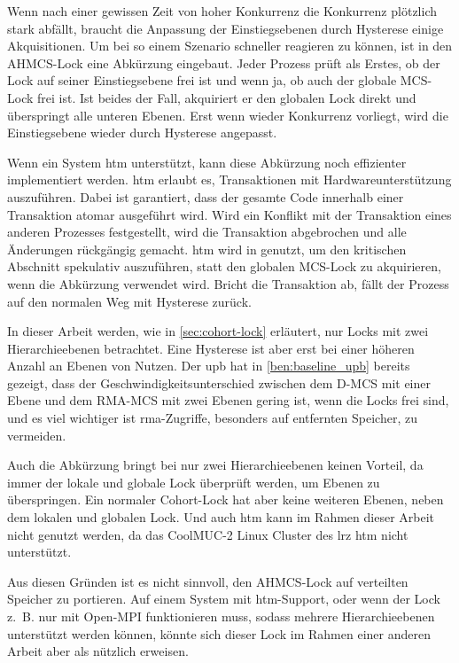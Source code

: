 Wenn nach einer gewissen Zeit von hoher \gls{Konkurrenz}
die \gls{Konkurrenz} plötzlich stark abfällt,
braucht die Anpassung der Einstiegsebenen durch Hysterese einige Akquisitionen.
Um bei so einem Szenario schneller reagieren zu können,
ist in den AHMCS-Lock eine Abkürzung eingebaut.
Jeder Prozess prüft als Erstes,
ob der Lock auf seiner Einstiegsebene frei ist
und wenn ja,
ob auch der globale MCS-Lock frei ist.
Ist beides der Fall,
akquiriert er den globalen Lock direkt
und überspringt alle unteren Ebenen.
Erst wenn wieder \gls{Konkurrenz} vorliegt,
wird die Einstiegsebene wieder durch Hysterese angepasst.

Wenn ein System \gls{htm} unterstützt,
kann diese Abkürzung noch effizienter implementiert werden.
\Gls{htm} erlaubt es,
Transaktionen mit Hardwareunterstützung auszuführen.
Dabei ist garantiert,
dass der gesamte Code innerhalb einer Transaktion atomar ausgeführt wird.
Wird ein Konflikt mit der Transaktion eines anderen Prozesses festgestellt,
wird die Transaktion abgebrochen und alle Änderungen rückgängig gemacht.
\gls{htm} wird in \cite{AHMCS-Lock} genutzt,
um den kritischen Abschnitt spekulativ auszuführen,
statt den globalen MCS-Lock zu akquirieren,
wenn die Abkürzung verwendet wird.
Bricht die Transaktion ab,
fällt der Prozess auf den normalen Weg mit Hysterese zurück.

In dieser Arbeit werden,
wie in \autoref{sec:cohort-lock} erläutert,
nur Locks mit zwei Hierarchieebenen betrachtet.
Eine Hysterese ist aber erst bei einer höheren Anzahl an Ebenen von Nutzen.
Der \gls{upb} hat in \autoref{ben:baseline_upb} bereits gezeigt,
dass der Geschwindigkeitsunterschied zwischen dem D-MCS mit einer Ebene und dem RMA-MCS mit zwei Ebenen gering ist,
wenn die Locks frei sind,
und es viel wichtiger ist \gls{rma}-Zugriffe,
besonders auf entfernten Speicher,
zu vermeiden.

Auch die Abkürzung bringt bei nur zwei Hierarchieebenen keinen Vorteil,
da immer der lokale und globale Lock überprüft werden,
um Ebenen zu überspringen.
Ein normaler Cohort-Lock hat aber keine weiteren Ebenen,
neben dem lokalen und globalen Lock.
Und auch \gls{htm} kann im Rahmen dieser Arbeit nicht genutzt werden,
da das CoolMUC-2 Linux Cluster des \gls{lrz} \gls{htm} nicht unterstützt.

Aus diesen Gründen ist es nicht sinnvoll,
den AHMCS-Lock auf verteilten Speicher zu portieren.
Auf einem System mit \gls{htm}-Support,
oder wenn der Lock z.~B. nur mit Open-MPI funktionieren muss,
sodass mehrere Hierarchieebenen unterstützt werden können,
könnte sich dieser Lock im Rahmen einer anderen Arbeit aber als nützlich erweisen.

